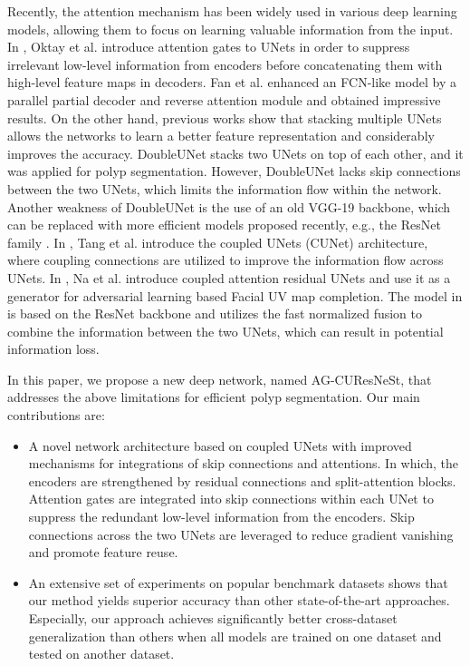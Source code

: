 \documentclass[review, sort&compress]{elsarticle}
\begin{document}
Recently, the attention mechanism has been widely used in various deep learning models, allowing them to focus on learning valuable information from the input. In \cite{oktay2018attention}, Oktay et al. introduce attention gates to UNets in order to suppress irrelevant low-level information from encoders before concatenating them with high-level feature maps in decoders. Fan et al. \cite{fan2020pranet} enhanced an FCN-like model by a parallel partial decoder and reverse attention module and obtained impressive results.
On the other hand, previous works show that stacking multiple UNets allows the networks to learn a better feature representation and considerably improves the accuracy. DoubleUNet \cite{jha2020doubleu} stacks two UNets on top of each other, and it was applied for polyp segmentation. However, DoubleUNet lacks skip connections between the two UNets, which limits the information flow within the network. Another weakness of DoubleUNet is the use of an old VGG-19 backbone, which can be replaced with more efficient models proposed recently, e.g., the ResNet family \cite{xie2017aggregated,he2016deep,zhang2020resnest}. In \cite{tang2019cu}, Tang et al. introduce the coupled UNets (CUNet) architecture, where coupling connections are utilized to improve the information flow across UNets. In \cite{na2020facial}, Na et al. introduce coupled attention residual UNets and use it as a generator for adversarial learning based Facial UV map completion. The model in \cite{na2020facial} is based on the ResNet backbone and utilizes the fast normalized fusion \cite{tan2020efficientdet} to combine the information between the two UNets, which can result in potential information loss.

In this paper, we propose a new deep network, named AG-CUResNeSt, that addresses the above limitations for efficient polyp segmentation. Our main contributions are:
\begin{itemize}
\item A novel network architecture based on coupled UNets with improved mechanisms for integrations of skip connections and attentions. In which, the encoders are strengthened by residual connections and split-attention blocks. Attention gates are integrated into skip connections within each UNet to suppress the redundant low-level information from the encoders. Skip connections across the two UNets are leveraged to reduce gradient vanishing and promote feature reuse.
\item An extensive set of experiments on popular benchmark datasets shows that our method yields superior accuracy than other state-of-the-art approaches. Especially, our approach achieves significantly better cross-dataset generalization than others when all models are trained on one dataset and tested on another dataset.
\end{itemize}
\end{document}
